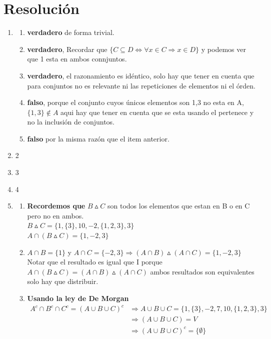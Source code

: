 \documentclass[12pt]{book}
\begin{document}
\section{Resoluci\'on}
\begin{enumerate}
\item 
	\begin{enumerate}[i]
	\item \textbf{verdadero} de forma trivial.
	\item \textbf{verdadero}, Recordar que $ \{ C \subseteq D \Leftrightarrow \forall x \in C \Rightarrow x \in D \} $ y podemos ver 			que 1 esta en ambos connjuntos.
	\item \textbf{verdadero}, el razonamiento es id\'entico, solo hay que tener en cuenta que para conjuntos no es 				relevante 	ni las repeticiones de elementos ni el \'orden.
	\item \textbf{falso}, porque el conjunto cuyos \'unicos elementos son 1,3 no esta en A, $ \{ 1, 3\} \notin A $ aqui 			hay que tener en cuenta que se esta usando el pertenece y no la inclusi\'on de conjuntos.
	\item \textbf{falso} por la misma raz\'on que el item anterior.
	\end{enumerate}
\item 2
\item 3
\item 4
\item 	
	\begin{enumerate}[i]
	\item \textbf{Recordemos que} $B \vartriangle C $ son todos los elementos que estan en B o en C pero no en ambos.\\
		$B\vartriangle C = \{ 1, \{ 3 \}, 10, -2, \{1, 2, 3\}, 3 \} $ \\
		$ A\cap (B\vartriangle C ) = \{ 1, -2, 3\}$ \\ 
		
	\item $ A\cap B = \{ 1\} $ y $ A\cap C = \{ -2,3\}  \Rightarrow  (A\cap B) \vartriangle (A\cap C ) =  \{1, 					-2,3\} $ \\
	Notar que el resultado es igual que I porque $ A\cap (B\vartriangle C ) =  (A\cap B) \vartriangle (A\cap C )$
	ambos resultados son equivalentes solo hay que distribuir.\\
	
	\item \textbf{Usando la ley de De Morgan} 
	\begin{align*}
	A^{c} \cap B^c \cap C^c = (A\cup B\cup C)^c & \Rightarrow A \cup B\cup C = \{1, \{3\}, -2, 7, 10, \{1, 2, 3\}, 3\} \\
	&\Rightarrow (A\cup B\cup C) =  V  \\
	&\Rightarrow (A\cup B\cup C)^c = \lbrace \emptyset \rbrace
	\end{align*}
	

\end{enumerate}
\end{enumerate}
\end{document}
